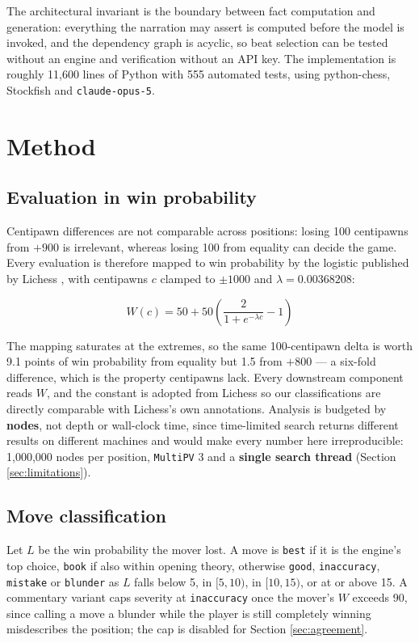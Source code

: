 \documentclass[conference]{IEEEtran}
\begin{document}
The architectural invariant is the boundary between fact computation and
generation: everything the narration may assert is computed before the model
is invoked, and the dependency graph is acyclic, so beat selection can be
tested without an engine and verification without an API key. The
implementation is roughly 11,600 lines of Python with 555 automated tests,
using python-chess, Stockfish and \texttt{claude-opus-5}.

\section{Method}

\subsection{Evaluation in win probability}

Centipawn differences are not comparable across positions: losing 100
centipawns from $+900$ is irrelevant, whereas losing 100 from equality can
decide the game. Every evaluation is therefore mapped to win probability by
the logistic published by Lichess \cite{lichessaccuracy}, with centipawns
$c$ clamped to $\pm 1000$ and $\lambda = 0.00368208$:

\begin{equation}
W(c) = 50 + 50\left(\frac{2}{1 + e^{-\lambda c}} - 1\right)
\end{equation}

The mapping saturates at the extremes, so the same 100-centipawn delta is
worth 9.1 points of win probability from equality but 1.5 from $+800$ --- a
six-fold difference, which is the property centipawns lack. Every downstream
component reads $W$, and the constant is adopted from Lichess so our
classifications are directly comparable with Lichess's own annotations.
Analysis is budgeted by \textbf{nodes}, not depth or wall-clock time, since
time-limited search returns different results on different machines and
would make every number here irreproducible: 1,000,000 nodes per position,
\texttt{MultiPV} 3 and a \textbf{single search thread} (Section
\ref{sec:limitations}).

\subsection{Move classification}
\label{sec:classification}

Let $L$ be the win probability the mover lost. A move is \texttt{best} if it
is the engine's top choice, \texttt{book} if also within opening theory,
otherwise \texttt{good}, \texttt{inaccuracy}, \texttt{mistake} or
\texttt{blunder} as $L$ falls below 5, in $[5,10)$, in $[10,15)$, or at or
above 15. A commentary variant caps severity at \texttt{inaccuracy} once the
mover's $W$ exceeds 90, since calling a move a blunder while the player is
still completely winning misdescribes the position; the cap is disabled for
Section \ref{sec:agreement}.
\end{document}
